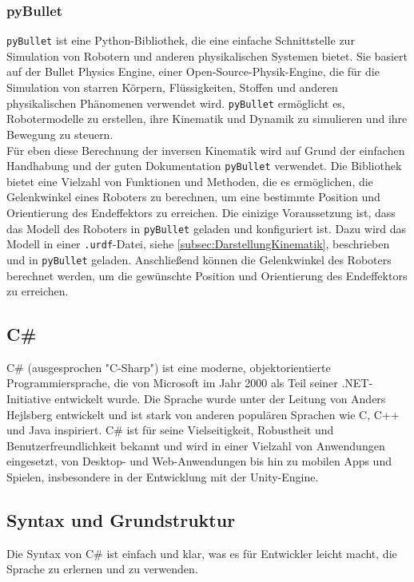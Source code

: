 \subsubsection{pyBullet}\label{subsubsec:pyBullet}
\texttt{pyBullet} ist eine Python-Bibliothek, die eine einfache Schnittstelle zur Simulation von Robotern und anderen physikalischen Systemen bietet. Sie basiert auf der Bullet Physics Engine, einer Open-Source-Physik-Engine, die für die Simulation von starren Körpern, Flüssigkeiten, Stoffen und anderen physikalischen Phänomenen verwendet wird. \texttt{pyBullet} ermöglicht es, Robotermodelle zu erstellen, ihre Kinematik und Dynamik zu simulieren und ihre Bewegung zu steuern.\\
Für eben diese Berechnung der inversen Kinematik wird auf Grund der einfachen Handhabung und der guten Dokumentation \texttt{pyBullet} verwendet. Die Bibliothek bietet eine Vielzahl von Funktionen und Methoden, die es ermöglichen, die Gelenkwinkel eines Roboters zu berechnen, um eine bestimmte Position und Orientierung des Endeffektors zu erreichen. Die einizige Voraussetzung ist, dass das Modell des Roboters in \texttt{pyBullet} geladen und konfiguriert ist. Dazu wird das Modell in einer \texttt{.urdf}-Datei, siehe \autoref{subsec:DarstellungKinematik}, beschrieben und in \texttt{pyBullet} geladen. Anschließend können die Gelenkwinkel des Roboters berechnet werden, um die gewünschte Position und Orientierung des Endeffektors zu erreichen.\\
\subsection{C\#}
C\# (ausgesprochen "C-Sharp") ist eine moderne, objektorientierte Programmiersprache, die von Microsoft im Jahr 2000 als Teil seiner .NET-Initiative entwickelt wurde. Die Sprache wurde unter der Leitung von Anders Hejlsberg entwickelt und ist stark von anderen populären Sprachen wie C, C++ und Java inspiriert. C\# ist für seine Vielseitigkeit, Robustheit und Benutzerfreundlichkeit bekannt und wird in einer Vielzahl von Anwendungen eingesetzt, von Desktop- und Web-Anwendungen bis hin zu mobilen Apps und Spielen, insbesondere in der Entwicklung mit der Unity-Engine.

\subsection{Syntax und Grundstruktur}

Die Syntax von C\# ist einfach und klar, was es für Entwickler leicht macht, die Sprache zu erlernen und zu verwenden.
